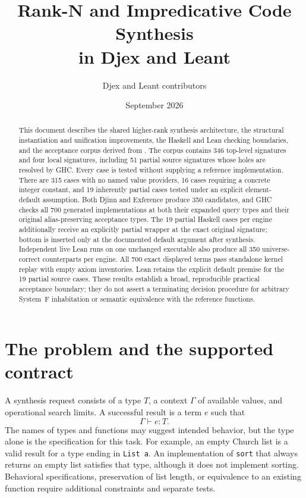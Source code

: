 \documentclass[11pt]{article}
\title{Rank-N and Impredicative Code Synthesis\\in Djex and Leant}
\author{Djex and Leant contributors}
\date{September 2026}
\newcommand{\code}[1]{\texttt{#1}}
\newcommand{\ctx}{\Gamma}
\begin{document}
\maketitle

\begin{abstract}
This document describes the shared higher-rank synthesis architecture, the
structural instantiation and unification improvements, the Haskell and Lean
checking boundaries, and the acceptance corpus derived from
. The corpus contains 346 top-level signatures
and four local signatures, including 51 partial source signatures whose holes
are resolved by GHC. Every case is tested without supplying a reference
implementation. There are 315 cases with no named value providers, 16 cases
requiring a concrete integer constant, and 19 inherently partial cases tested
under an explicit element-default assumption. Both Djinn and Exference produce
350 candidates, and GHC checks all 700 generated implementations at both their
expanded query types and their original alias-preserving acceptance types.
The 19 partial Haskell cases per engine additionally receive an explicitly
partial wrapper at the exact original signature; bottom is inserted only at
the documented default argument after synthesis.
Independent live Lean runs on one unchanged executable also produce all 350
universe-correct counterparts per engine. All 700 exact displayed terms pass
standalone kernel replay with empty axiom inventories. Lean retains the
explicit default premise for the 19 partial source cases. These results establish a broad, reproducible
practical acceptance boundary; they do not assert a terminating decision
procedure for arbitrary System~F inhabitation or semantic equivalence with the
reference functions.
\end{abstract}

\newpage
\tableofcontents
\newpage

\section{The problem and the supported contract}

A synthesis request consists of a type $T$, a context $\ctx$ of available
values, and operational search limits. A successful result is a term $e$ such
that
\[
  \ctx \vdash e : T.
\]
The names of types and functions may suggest intended behavior, but the type
alone is the specification for this task. For example, an empty Church list
is a valid result for a type ending in \code{List a}. An implementation of
\code{sort} that always returns an empty list satisfies that type, although it
does not implement sorting. Behavioral specifications, preservation of list
length, or equivalence to an existing function require additional constraints
and separate tests.
\end{document}
